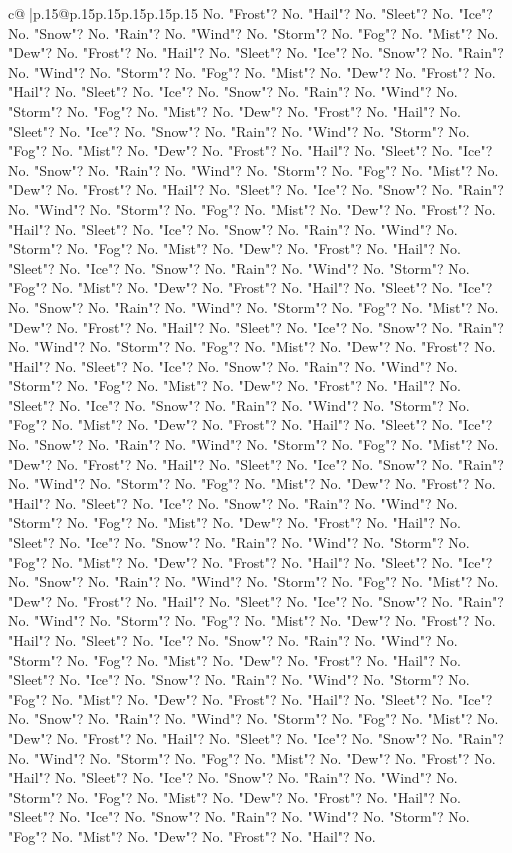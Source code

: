 \documentclass{article}
\begin{document}
{\begin{supertabular}{c@{$\;$}|p{.15\linewidth}@{}p{.15\linewidth}p{.15\linewidth}p{.15\linewidth}p{.15\linewidth}p{.15\linewidth}}
{{{No. "Frost"? No. "Hail"? No. "Sleet"? No. "Ice"? No. "Snow"? No. "Rain"? No. "Wind"? No. "Storm"? No. "Fog"? No. "Mist"? No. "Dew"? No. "Frost"? No. "Hail"? No. "Sleet"? No. "Ice"? No. "Snow"? No. "Rain"? No. "Wind"? No. "Storm"? No. "Fog"? No. "Mist"? No. "Dew"? No. "Frost"? No. "Hail"? No. "Sleet"? No. "Ice"? No. "Snow"? No. "Rain"? No. "Wind"? No. "Storm"? No. "Fog"? No. "Mist"? No. "Dew"? No. "Frost"? No. "Hail"? No. "Sleet"? No. "Ice"? No. "Snow"? No. "Rain"? No. "Wind"? No. "Storm"? No. "Fog"? No. "Mist"? No. "Dew"? No. "Frost"? No. "Hail"? No. "Sleet"? No. "Ice"? No. "Snow"? No. "Rain"? No. "Wind"? No. "Storm"? No. "Fog"? No. "Mist"? No. "Dew"? No. "Frost"? No. "Hail"? No. "Sleet"? No. "Ice"? No. "Snow"? No. "Rain"? No. "Wind"? No. "Storm"? No. "Fog"? No. "Mist"? No. "Dew"? No. "Frost"? No. "Hail"? No. "Sleet"? No. "Ice"? No. "Snow"? No. "Rain"? No. "Wind"? No. "Storm"? No. "Fog"? No. "Mist"? No. "Dew"? No. "Frost"? No. "Hail"? No. "Sleet"? No. "Ice"? No. "Snow"? No. "Rain"? No. "Wind"? No. "Storm"? No. "Fog"? No. "Mist"? No. "Dew"? No. "Frost"? No. "Hail"? No. "Sleet"? No. "Ice"? No. "Snow"? No. "Rain"? No. "Wind"? No. "Storm"? No. "Fog"? No. "Mist"? No. "Dew"? No. "Frost"? No. "Hail"? No. "Sleet"? No. "Ice"? No. "Snow"? No. "Rain"? No. "Wind"? No. "Storm"? No. "Fog"? No. "Mist"? No. "Dew"? No. "Frost"? No. "Hail"? No. "Sleet"? No. "Ice"? No. "Snow"? No. "Rain"? No. "Wind"? No. "Storm"? No. "Fog"? No. "Mist"? No. "Dew"? No. "Frost"? No. "Hail"? No. "Sleet"? No. "Ice"? No. "Snow"? No. "Rain"? No. "Wind"? No. "Storm"? No. "Fog"? No. "Mist"? No. "Dew"? No. "Frost"? No. "Hail"? No. "Sleet"? No. "Ice"? No. "Snow"? No. "Rain"? No. "Wind"? No. "Storm"? No. "Fog"? No. "Mist"? No. "Dew"? No. "Frost"? No. "Hail"? No. "Sleet"? No. "Ice"? No. "Snow"? No. "Rain"? No. "Wind"? No. "Storm"? No. "Fog"? No. "Mist"? No. "Dew"? No. "Frost"? No. "Hail"? No. "Sleet"? No. "Ice"? No. "Snow"? No. "Rain"? No. "Wind"? No. "Storm"? No. "Fog"? No. "Mist"? No. "Dew"? No. "Frost"? No. "Hail"? No. "Sleet"? No. "Ice"? No. "Snow"? No. "Rain"? No. "Wind"? No. "Storm"? No. "Fog"? No. "Mist"? No. "Dew"? No. "Frost"? No. "Hail"? No. "Sleet"? No. "Ice"? No. "Snow"? No. "Rain"? No. "Wind"? No. "Storm"? No. "Fog"? No. "Mist"? No. "Dew"? No. "Frost"? No. "Hail"? No. "Sleet"? No. "Ice"? No. "Snow"? No. "Rain"? No. "Wind"? No. "Storm"? No. "Fog"? No. "Mist"? No. "Dew"? No. "Frost"? No. "Hail"? No. "Sleet"? No. "Ice"? No. "Snow"? No. "Rain"? No. "Wind"? No. "Storm"? No. "Fog"? No. "Mist"? No. "Dew"? No. "Frost"? No. "Hail"? No. "Sleet"? No. "Ice"? No. "Snow"? No. "Rain"? No. "Wind"? No. "Storm"? No. "Fog"? No. "Mist"? No. "Dew"? No. "Frost"? No. "Hail"? No. "Sleet"? No. "Ice"? No. "Snow"? No. "Rain"? No. "Wind"? No. "Storm"? No. "Fog"? No. "Mist"? No. "Dew"? No. "Frost"? No. "Hail"? No. "Sleet"? No. "Ice"? No. "Snow"? No. "Rain"? No. "Wind"? No. "Storm"? No. "Fog"? No. "Mist"? No. "Dew"? No. "Frost"? No. "Hail"? No. "Sleet"? No. "Ice"? No. "Snow"? No. "Rain"? No. "Wind"? No. "Storm"? No. "Fog"? No. "Mist"? No. "Dew"? No. "Frost"? No. "Hail"? No. "Sleet"? No. "Ice"? No. "Snow"? No. "Rain"? No. "Wind"? No. "Storm"? No. "Fog"? No. "Mist"? No. "Dew"? No. "Frost"? No. "Hail"? No. }}}
\end{supertabular}}
\end{document}
